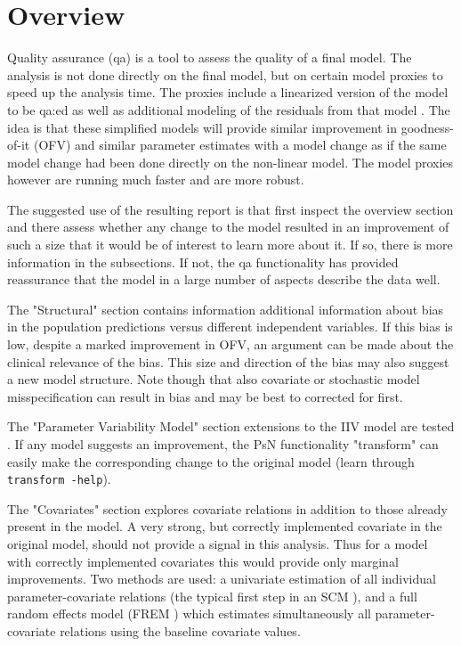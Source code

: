 



\maketitle
\newcommand{\guidetoolname}{qa}


\section{Overview}
Quality assurance (qa) is a tool to assess the quality of a final model. The analysis is not done directly on the final model, but on certain model proxies to speed up the analysis time.
The proxies include a linearized version of the model to be qa:ed as well as additional modeling of the residuals from that model \cite{Khandelwal, Svensson, Ibrahim}. The idea is that these simplified models will provide similar improvement in goodness-of-it (OFV) and similar parameter estimates with a model change as if the same model change had been done directly on the non-linear model. The model proxies however are running much faster and are more robust. 

The suggested use of the resulting report is that first inspect the overview section and there assess whether any change to the model resulted in an improvement of such a size that it would be of interest to learn more about it. If so, there is more information in the subsections. If not, the qa functionality has provided reassurance that the model in a large number of aspects describe the data well. 

The "Structural" section contains information additional information about bias in the population predictions versus different independent variables.  If this bias is low, despite a marked improvement in OFV, an argument can be made about the clinical relevance of the bias. This size and direction of the bias may also suggest a new model structure. Note though that also covariate or stochastic model misspecification can result in bias and may be best to corrected for first. 

The "Parameter Variability Model" section extensions to the IIV model are tested \cite{Svensson, Petersson}. If any model suggests an improvement, the PsN functionality "transform" can easily make the corresponding change to the original model (learn through \verb|transform -help|).

The "Covariates" section explores covariate relations in addition to those already present in the model. A very strong, but correctly implemented covariate in the original model, should not provide a signal in this analysis. Thus for a model with correctly implemented covariates this would provide only marginal improvements. Two methods are used: a univariate estimation of all individual parameter-covariate relations (the typical first step in an SCM \cite{Jonsson}), and a full random effects model (FREM \cite{Karlsson, Yun, Yngman}) which estimates simultaneously all parameter-covariate relations using the baseline covariate values.

